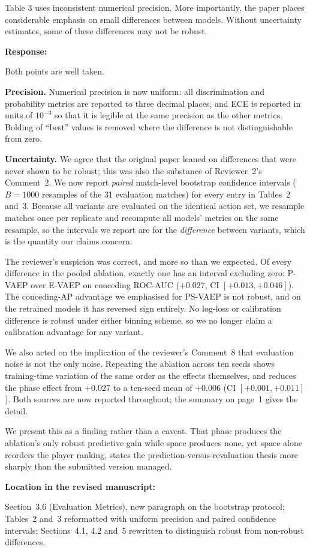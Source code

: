 \documentclass[11pt,a4paper]{article}
\newcommand{\pending}[1]{\textcolor{statuspending}{#1}}
\newcommand{\response}[2]{%
  \begin{responsebox}
  \textbf{Response:}

  #1
  \end{responsebox}
  \begin{locationbox}
  \textbf{Location in the revised manuscript:}

  #2
  \end{locationbox}
}
\begin{document}
\begin{reviewbox}[Comment 5]
Table 3 uses inconsistent numerical precision. More importantly, the paper places considerable emphasis on small differences between models. Without uncertainty estimates, some of these differences may not be robust.
\end{reviewbox}
\response{Both points are well taken.

\textbf{Precision.} Numerical precision is now uniform: all discrimination and probability metrics are reported to three decimal places, and ECE is reported in units of $10^{-3}$ so that it is legible at the same precision as the other metrics. Bolding of ``best'' values is removed where the difference is not distinguishable from zero.

\pending{\textbf{Uncertainty.} We agree that the original paper leaned on differences that were never shown to be robust; this was also the substance of Reviewer~2's Comment~2. We now report \emph{paired} match-level bootstrap confidence intervals ($B = 1000$ resamples of the 31 evaluation matches) for every entry in Tables~2 and~3. Because all variants are evaluated on the identical action set, we resample matches once per replicate and recompute all models' metrics on the same resample, so the intervals we report are for the \emph{difference} between variants, which is the quantity our claims concern.}

The reviewer's suspicion was correct, and more so than we expected. Of every difference in the pooled ablation, exactly one has an interval excluding zero: P-VAEP over E-VAEP on conceding ROC-AUC ($+0.027$, CI $[+0.013, +0.046]$). The conceding-AP advantage we emphasised for PS-VAEP is not robust, and on the retrained models it has reversed sign entirely. No log-loss or calibration difference is robust under either binning scheme, so we no longer claim a calibration advantage for any variant.

We also acted on the implication of the reviewer's Comment~8 that evaluation noise is not the only noise. Repeating the ablation across ten seeds shows training-time variation of the same order as the effects themselves, and reduces the phase effect from $+0.027$ to a ten-seed mean of $+0.006$ (CI $[+0.001, +0.011]$). Both sources are now reported throughout; the summary on page~1 gives the detail.

We present this as a finding rather than a caveat. That phase produces the ablation's only robust predictive gain while space produces none, yet space alone reorders the player ranking, states the prediction-versus-revaluation thesis more sharply than the submitted version managed.}{Section~3.6 (Evaluation Metrics), new paragraph on the bootstrap protocol; Tables~2 and~3 reformatted with uniform precision and paired confidence intervals; Sections~4.1, 4.2 and~5 rewritten to distinguish robust from non-robust differences.}
\end{document}
